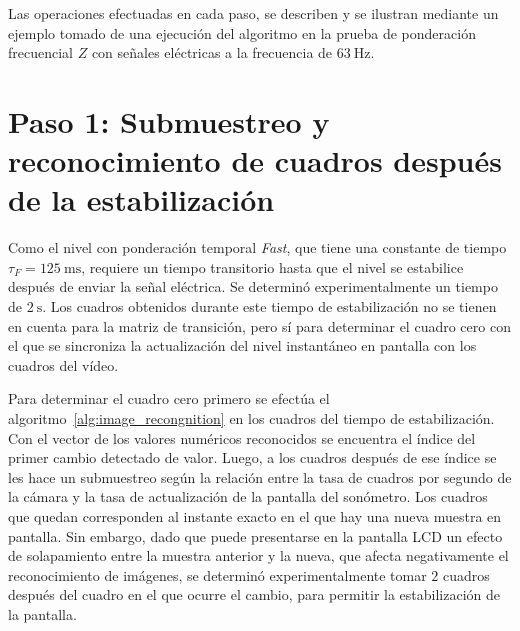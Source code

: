 Las operaciones efectuadas en cada paso, se describen y se ilustran mediante un ejemplo tomado de una ejecución del
algoritmo en la prueba de ponderación frecuencial $Z$ con señales eléctricas a la frecuencia de $\qty{63}{\Hz}$.

\section*{Paso 1: Submuestreo y reconocimiento de cuadros después de la estabilización}
\label{sec:downsampling}

Como el nivel con ponderación temporal \emph{Fast}, que tiene una constante de tiempo $\tau_F = \qty{125}{\ms}$,
requiere un tiempo transitorio hasta que el nivel se estabilice después de enviar la señal eléctrica.
Se determinó experimentalmente un tiempo de $\qty{2}{\s}$.
Los cuadros obtenidos durante este tiempo de estabilización no se tienen en cuenta para la matriz de transición,
pero sí para determinar el cuadro cero con el que se sincroniza la actualización del nivel instantáneo en pantalla con
los cuadros del vídeo.

Para determinar el cuadro cero primero se efectúa el algoritmo~\ref{alg:image_recongnition} en los cuadros del tiempo
de estabilización.
Con el vector de los valores numéricos reconocidos se encuentra el índice del primer cambio detectado de valor.
Luego, a los cuadros después de ese índice se les hace un submuestreo según la relación entre la tasa de cuadros por
segundo de la cámara y la tasa de actualización de la pantalla del sonómetro.
Los cuadros que quedan corresponden al instante exacto en el que hay una nueva muestra en pantalla.
Sin embargo, dado que puede presentarse en la pantalla LCD un efecto de solapamiento entre la muestra anterior y la
nueva, que afecta negativamente el reconocimiento de imágenes, se determinó experimentalmente tomar $2$ cuadros después
del cuadro en el que ocurre el cambio, para permitir la estabilización de la pantalla.


